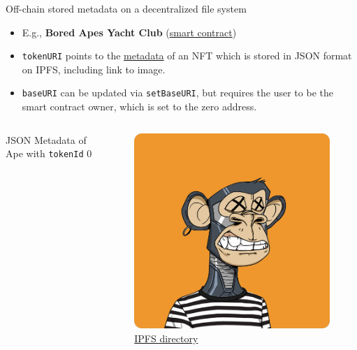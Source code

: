 \documentclass[]{beamer}
\begin{document}
\begin{frame}{Off-chain stored metadata on a decentralized file system}

	\begin{itemize}
		\item E.g., \textbf{Bored Apes Yacht Club} (\href{https://etherscan.io/address/0xbc4ca0eda7647a8ab7c2061c2e118a18a936f13d}{\link smart contract})
		\item \texttt{tokenURI} points to the \href{ipfs://QmeSjSinHpPnmXmspMjwiXyN6zS4E9zccariGR3jxcaWtq/1}{\link metadata}  of an NFT which is stored in JSON format on IPFS, including link to image.
		\item \texttt{baseURI} can be updated via \texttt{setBaseURI}, but requires the user to be the smart contract owner, which is set to the zero address.
	\end{itemize} 
	\begin{columns}
		\begin{column}{0.67\textwidth}
		\vspace{-1em}
			\begin{samplecode}{JSON Metadata of Ape with \texttt{tokenId} 0}
				
			\end{samplecode}		
		\end{column}
		\begin{column}{0.35\textwidth}
			\begin{figure}
				\vspace{-1em}
				\centering
				\includegraphics[scale=0.18]{../assets/images/ape_0.png}
				\caption*{\link \href{https://bafybeibnzhc7vp4hnfcocw7s2jej2tj5xqpwseyz3ifylismh47cr45rhm.ipfs.dweb.link/}{IPFS directory}}	
			\end{figure}
		\end{column}
	\end{columns}
\end{frame}
\end{document}
